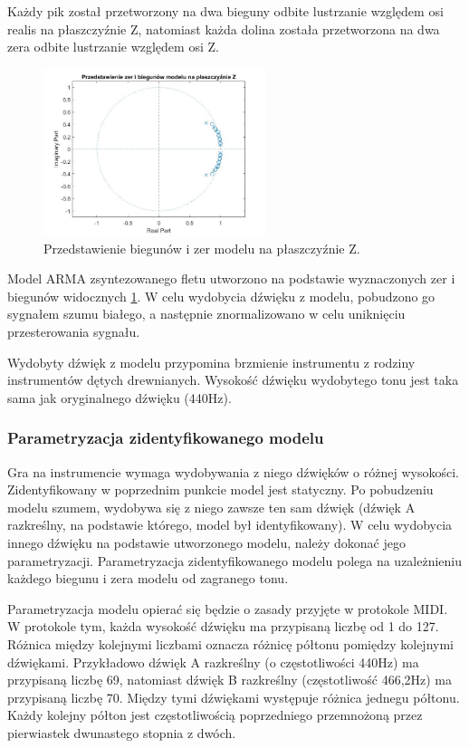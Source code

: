 Każdy pik został przetworzony na dwa bieguny odbite lustrzanie względem osi realis na płaszczyźnie Z, natomiast każda dolina została przetworzona na dwa zera odbite lustrzanie względem osi Z.
\begin{figure}[H]
	\centering
	\includegraphics[width=6.5cm]{grafiki/Bieguny_na_plaszcz_Z}
	\captionsetup{justification=centering}
	\caption{Przedstawienie biegunów i zer modelu na płaszczyźnie Z.}
	\label{rys:plaszcz_Z}
\end{figure}
Model ARMA zsyntezowanego fletu utworzono na podstawie wyznaczonych zer i biegunów widocznych \ref{rys:plaszcz_Z}. W celu wydobycia dźwięku z modelu, pobudzono go sygnałem szumu białego, a następnie znormalizowano w celu uniknięciu przesterowania sygnału. 


Wydobyty dźwięk z modelu przypomina brzmienie instrumentu z rodziny instrumentów dętych drewnianych. Wysokość dźwięku wydobytego tonu jest taka sama jak oryginalnego dźwięku (440Hz).

\subsubsection{Parametryzacja zidentyfikowanego modelu}
Gra na instrumencie wymaga wydobywania z niego dźwięków o różnej wysokości. Zidentyfikowany w poprzednim punkcie model jest statyczny. Po pobudzeniu modelu szumem, wydobywa się z niego zawsze ten sam dźwięk (dźwięk A razkreślny, na podstawie którego, model był identyfikowany). W celu wydobycia innego dźwięku na podstawie utworzonego modelu, należy dokonać jego parametryzacji. Parametryzacja zidentyfikowanego modelu polega na uzależnieniu każdego biegunu i zera modelu od zagranego tonu.


Parametryzacja modelu opierać się będzie o zasady przyjęte w protokole MIDI. W protokole tym, każda wysokość dźwięku ma przypisaną liczbę od 1 do 127. Różnica między kolejnymi liczbami oznacza różnicę półtonu pomiędzy kolejnymi dźwiękami. Przykładowo dźwięk A razkreślny (o częstotliwości 440Hz) ma przypisaną liczbę 69, natomiast dźwięk B razkreślny (częstotliwość 466,2Hz) ma przypisaną liczbę 70. Między tymi dźwiękami występuje różnica jednegu półtonu. Każdy kolejny półton jest częstotliwością poprzedniego przemnożoną przez pierwiastek dwunastego stopnia z dwóch.


